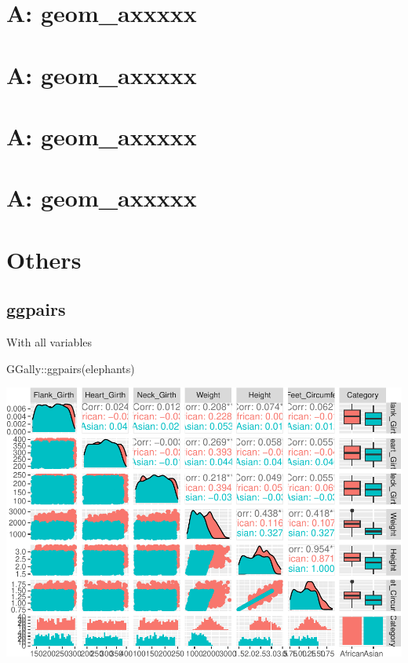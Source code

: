 \documentclass[
]{book}
\newenvironment{Shaded}{\begin{snugshade}}{\end{snugshade}}
\newcommand{\FunctionTok}[1]{\textcolor[rgb]{0.00,0.00,0.00}{#1}}
\newcommand{\NormalTok}[1]{#1}
\newcommand{\SpecialCharTok}[1]{\textcolor[rgb]{0.00,0.00,0.00}{#1}}
\begin{document}
\hypertarget{a-geom_axxxxx-9}{%
\chapter{A: geom\_axxxxx}\label{a-geom_axxxxx-9}}

\hypertarget{a-geom_axxxxx-10}{%
\chapter{A: geom\_axxxxx}\label{a-geom_axxxxx-10}}

\hypertarget{a-geom_axxxxx-11}{%
\chapter{A: geom\_axxxxx}\label{a-geom_axxxxx-11}}

\hypertarget{a-geom_axxxxx-12}{%
\chapter{A: geom\_axxxxx}\label{a-geom_axxxxx-12}}

\hypertarget{others}{%
\chapter{Others}\label{others}}

\hypertarget{ggpairs}{%
\section{ggpairs}\label{ggpairs}}

With all variables

\begin{Shaded}
\begin{Highlighting}[]
\NormalTok{GGally}\SpecialCharTok{::}\FunctionTok{ggpairs}\NormalTok{(elephants)}
\end{Highlighting}
\end{Shaded}

\includegraphics{Data-Visualisation-geom-Encyclopedia_files/figure-latex/unnamed-chunk-56-1.pdf}
\end{document}
